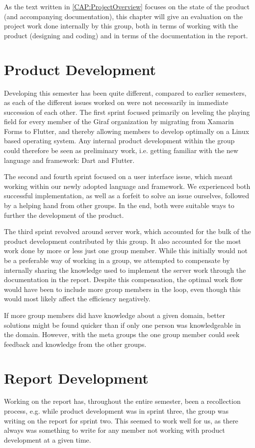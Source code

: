 As the text written in \autoref{CAP:ProjectOverview} focuses on the state of the product (and accompanying documentation), this chapter will give an evaluation on the project work done internally by this group, both in terms of working with the product (designing and coding) and in terms of the documentation in the report.

\section{Product Development}
Developing this semester has been quite different, compared to earlier semesters, as each of the different issues worked on were not necessarily in immediate succession of each other.
The first sprint focused primarily on leveling the playing field for every member of the Giraf organization by migrating from Xamarin Forms to Flutter, and thereby allowing members to develop optimally on a Linux based operating system.
Any internal product development within the group could therefore be seen as preliminary work, i.e. getting familiar with the new language and framework: Dart and Flutter.


The second and fourth sprint focused on a user interface issue, which meant working within our newly adopted language and framework.
We experienced both successful implementation, as well as a forfeit to solve an issue ourselves, followed by a helping hand from other groups.
In the end, both were suitable ways to further the development of the product.

The third sprint revolved around server work, which accounted for the bulk of the product development contributed by this group.
It also accounted for the most work done by more or less just one group member.
While this initially would not be a preferable way of working in a group, we attempted to compensate by internally sharing the knowledge used to implement the server work through the documentation in the report.
Despite this compensation, the optimal work flow would have been to include more group members in the loop, even though this would most likely affect the efficiency negatively.

If more group members did have knowledge about a given domain, better solutions might be found quicker than if only one person was knowledgeable in the domain.
However, with the meta groups the one group member could seek feedback and knowledge from the other groups.

\section{Report Development}
Working on the report has, throughout the entire semester, been a recollection process, e.g. while product development was in sprint three, the group was writing on the report for sprint two.
This seemed to work well for us, as there always was something to write for any member not working with product development at a given time.

